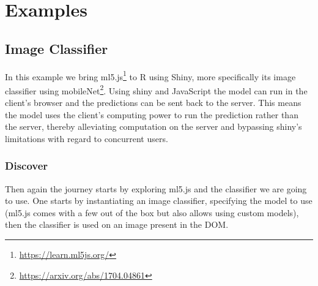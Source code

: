 \documentclass[
]{krantz}
\renewcommand{\href}[2]{#2\footnote{\url{#1}}}
\begin{document}
\hypertarget{part-examples}{%
\part{Examples}\label{part-examples}}

\hypertarget{image-classifier}{%
\chapter{Image Classifier}\label{image-classifier}}

In this example we bring \href{https://learn.ml5js.org/}{ml5.js} to R using Shiny, more specifically its image classifier using \href{https://arxiv.org/abs/1704.04861}{mobileNet}. Using shiny and JavaScript the model can run in the client's browser and the predictions can be sent back to the server. This means the model uses the client's computing power to run the prediction rather than the server, thereby alleviating computation on the server and bypassing shiny's limitations with regard to concurrent users.

\hypertarget{discover}{%
\section{Discover}\label{discover}}

Then again the journey starts by exploring ml5.js and the classifier we are going to use. One starts by instantiating an image classifier, specifying the model to use (ml5.js comes with a few out of the box but also allows using custom models), then the classifier is used on an image present in the DOM.
\end{document}
